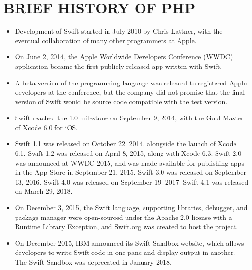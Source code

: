 \documentclass{article}
\begin{document}
\section*{BRIEF HISTORY OF PHP}
\begin{itemize}
	\item Development of Swift started in July 2010 by Chris Lattner, with the eventual collaboration of many other programmers at Apple.
	\item On June 2, 2014, the Apple Worldwide Developers Conference (WWDC) application became the first publicly released app written with Swift.
	\item A beta version of the programming language was released to registered Apple developers at the conference, but the company did not promise that the final version of Swift would be source code compatible with the test version.
	\item Swift reached the 1.0 milestone on September 9, 2014, with the Gold Master of Xcode 6.0 for iOS.
	\item Swift 1.1 was released on October 22, 2014, alongside the launch of Xcode 6.1. Swift 1.2 was released on April 8, 2015, along with Xcode 6.3. Swift 2.0 was announced at WWDC 2015, and was made available for publishing apps in the App Store in September 21, 2015. Swift 3.0 was released on September 13, 2016. Swift 4.0 was released on September 19, 2017. Swift 4.1 was released on March 29, 2018.
	\item On December 3, 2015, the Swift language, supporting libraries, debugger, and package manager were open-sourced under the Apache 2.0 license with a Runtime Library Exception, and Swift.org was created to host the project.
	\item On December 2015, IBM announced its Swift Sandbox website, which allows developers to write Swift code in one pane and display output in another. The Swift Sandbox was deprecated in January 2018.
\end{itemize}
\newpage
\end{document}
